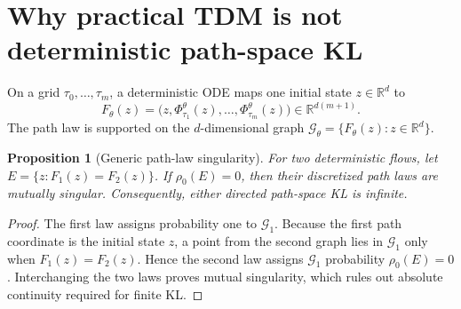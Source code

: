 \documentclass[11pt,a4paper]{article}
\newcommand{\R}{\mathbb{R}}
\theoremstyle{plain}
\newtheorem{proposition}[theorem]{Proposition}
\theoremstyle{definition}
\begin{document}
\section{Why practical TDM is not deterministic path-space KL}
\label{sec:path-singularity}

On a grid $\tau_0,\ldots,\tau_m$, a deterministic ODE maps one initial state $z\in\R^d$ to
\[
F_\theta(z)
=\bigl(z,\Phi^\theta_{\tau_1}(z),\ldots,\Phi^\theta_{\tau_m}(z)\bigr)
\in\R^{d(m+1)}.
\]
The path law is supported on the $d$-dimensional graph
$\mathcal G_\theta=\{F_\theta(z):z\in\R^d\}$.

\begin{proposition}[Generic path-law singularity]
\label{prop:path-singularity}
For two deterministic flows, let
$E=\{z:F_1(z)=F_2(z)\}$.  If $\rho_0(E)=0$, then their discretized path laws are mutually
singular.  Consequently, either directed path-space KL is infinite.
\end{proposition}

\begin{proof}
The first law assigns probability one to $\mathcal G_1$.  Because the first path coordinate is
the initial state $z$, a point from the second graph lies in $\mathcal G_1$ only when
$F_1(z)=F_2(z)$.  Hence the second law assigns $\mathcal G_1$ probability $\rho_0(E)=0$.
Interchanging the two laws proves mutual singularity, which rules out absolute continuity
required for finite KL.
\end{proof}
\end{document}
